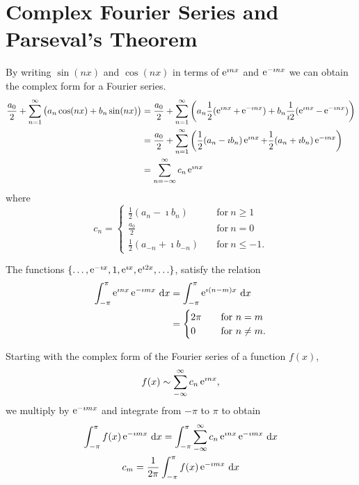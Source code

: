 \section{Complex Fourier Series and Parseval's Theorem}

By writing $\sin(n x)$ and $\cos(n x)$ in terms of $\mathop{\mathrm{e}}\nolimits^{\imath n x}$ and
$\mathop{\mathrm{e}}\nolimits^{-\imath n x}$ we can obtain the complex form for a Fourier series.
\begin{align*}
  \frac{a_0}{2} + \sum_{n=1}^\infty \big(a_n \cos(n x) + b_n \sin(n x)\big)
  &= \frac{a_0}{2} + \sum_{n=1}^\infty \left(a_n \frac{1}{2}(\mathop{\mathrm{e}}\nolimits^{\imath n x}
    + \mathop{\mathrm{e}}\nolimits^{-\imath n x}) + b_n \frac{1}{\imath 2}(\mathop{\mathrm{e}}\nolimits^{\imath n x} - \mathop{\mathrm{e}}\nolimits^{-\imath n x})
  \right)\\
  &= \frac{a_0}{2} + \sum_{n=1}^\infty \left(
    \frac{1}{2}(a_n - \imath b_n) \mathop{\mathrm{e}}\nolimits^{\imath n x}
    + \frac{1}{2}(a_n + \imath b_n) \mathop{\mathrm{e}}\nolimits^{-\imath n x} \right) \\
  &= \sum_{n=-\infty}^\infty c_n \mathop{\mathrm{e}}\nolimits^{\imath n x}
\end{align*}
where
\[ c_n = 
\begin{cases}
  \frac{1}{2}(a_n - \imath b_n) \quad &\mathrm{for}\ n \geq 1 \\
  \frac{a_0}{2} \quad &\mathrm{for}\ n = 0 \\
  \frac{1}{2}(a_{-n} + \imath b_{-n}) \quad &\mathrm{for}\ n \leq -1.
\end{cases}
\]


The functions $\{ \ldots, \mathop{\mathrm{e}}\nolimits^{-\imath x}, 1, \mathop{\mathrm{e}}\nolimits^{\imath x}, \mathop{\mathrm{e}}\nolimits^{\imath 2 x}, \ldots \}$,
satisfy the relation
\begin{align*}
  \int_{-\pi}^\pi \mathop{\mathrm{e}}\nolimits^{\imath n x} \mathop{\mathrm{e}}\nolimits^{-\imath m x}\,\mathrm{d} x 
  &= \int_{-\pi}^\pi \mathop{\mathrm{e}}\nolimits^{\imath (n-m) x}\,\mathrm{d} x \\
  &= 
  \begin{cases}
    2 \pi \quad &\mathrm{for}\ n = m \\
    0 \quad &\mathrm{for}\ n \neq m.
  \end{cases}
\end{align*}

Starting with the complex form of the Fourier series of a function $f(x)$,
\[ f(x) \sim \sum_{-\infty}^\infty c_n \mathop{\mathrm{e}}\nolimits^{\imath n x},\]
we multiply by $\mathop{\mathrm{e}}\nolimits^{-\imath m x}$ and integrate from $-\pi$ to $\pi$ to obtain
\begin{gather*}
  \int_{-\pi}^\pi f(x) \mathop{\mathrm{e}}\nolimits^{-\imath m x}\,\mathrm{d} x = \int_{-\pi}^\pi 
  \sum_{-\infty}^\infty c_n \mathop{\mathrm{e}}\nolimits^{\imath n x} \mathop{\mathrm{e}}\nolimits^{-\imath m x}\,\mathrm{d} x \\
  c_m = \frac{1}{2\pi} \int_{-\pi}^\pi f(x) \mathop{\mathrm{e}}\nolimits^{-\imath m x}\,\mathrm{d} x
\end{gather*}

